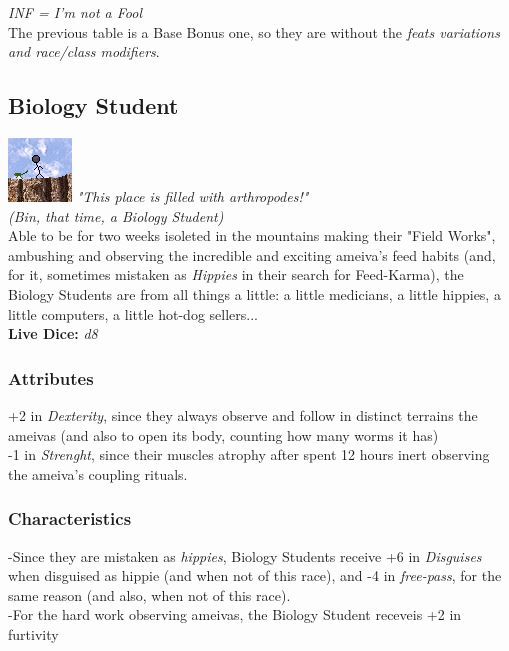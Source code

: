 \documentclass[ letterpaper,12pt]{article}
\begin{document}
{\it *INF = I'm not a Fool}\\

The previous table is a Base Bonus one, so they are without the {\it feats variations and race/class modifiers}.\\

\subsection{Biology Student}
\includegraphics{../data/classes/Img/biologia.png}
{\it "This place is filled with arthropodes!"\\(Bin, that time, a Biology Student)}\\

Able to be for two weeks isoleted in the mountains making their "Field Works",
ambushing and observing the incredible and exciting ameiva's feed habits (and,
for it, sometimes mistaken as {\it Hippies} in their search for Feed-Karma),
the Biology Students are from all things a little: a little medicians, a little
hippies, a little computers, a little hot-dog sellers...\\

{\bf Live Dice:} {\it d8}

\subsubsection{Attributes}
+2 in {\it Dexterity}, since they always observe and follow in distinct terrains the ameivas (and also to open its body, counting how many worms it has)\\
-1 in {\it Strenght}, since their muscles atrophy after spent 12 hours inert observing the ameiva's coupling rituals.\\

\subsubsection{Characteristics}
-Since they are mistaken as {\it hippies}, Biology Students receive +6 in {\it Disguises} when disguised as hippie (and when not of this race), and -4 in {\it free-pass}, for the same reason (and also, when not of this race).\\
-For the hard work observing ameivas, the Biology Student receveis +2 in {furtivity}\\
\end{document}
